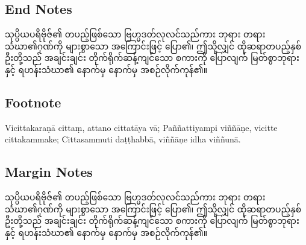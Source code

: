 \subsection{End Notes}
သုပ္ပိယပရိဗိုဇ်၏ တပည့်ဖြစ်သော ဗြဟ္မဒတ်လုလင်သည်ကား ဘုရား တရား သံဃာ၏ဂုဏ်ကို များစွာသော အကြောင်းဖြင့် ပြော၏၊ ဤသို့လျှင် ထိုဆရာတပည့်နှစ်ဦးတို့သည် အချင်းချင်း တိုက်ရိုက်ဆန့်ကျင်သော စကားကို ပြောလျက် မြတ်စွာဘုရားနှင့် ရဟန်းသံဃာ၏ နောက်မှ နောက်မှ အစဉ်လိုက်ကုန်၏။

\subsection{Footnote}
Vicittakaraṇā cittaṃ, attano cittatāya vā;
Paññattiyampi viññāṇe, vicitte cittakammake;
Cittasammuti daṭṭhabbā, viññāṇe idha viññunā.


\subsection{Margin Notes}
သုပ္ပိယပရိဗိုဇ်၏ တပည့်ဖြစ်သော ဗြဟ္မဒတ်လုလင်သည်ကား ဘုရား တရား သံဃာ၏ဂုဏ်ကို များစွာသော အကြောင်းဖြင့် ပြော၏၊ ဤသို့လျှင် ထိုဆရာတပည့်နှစ်ဦးတို့သည် အချင်းချင်း တိုက်ရိုက်ဆန့်ကျင်သော စကားကို ပြောလျက် မြတ်စွာဘုရားနှင့် ရဟန်းသံဃာ၏ နောက်မှ နောက်မှ အစဉ်လိုက်ကုန်၏။


\commentarytable